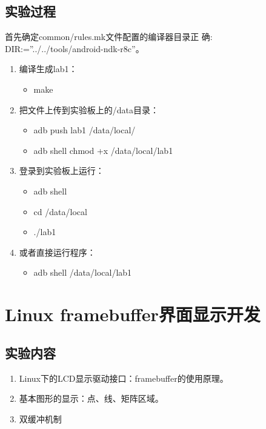 \documentclass{report}
\begin{document}
\section{实验过程}
\par 首先确定common/rules.mk文件配置的编译器目录正
确: DIR:=”../../tools/android-ndk-r8c”。
\begin{enumerate}
    \item 编译生成lab1：
        \begin{itemize}
            \item make
        \end{itemize}
    \item 把文件上传到实验板上的/data目录：
        \begin{itemize}
            \item adb push lab1 /data/local/
            \item adb shell chmod +x /data/local/lab1
        \end{itemize}
    \item 登录到实验板上运行：
        \begin{itemize}
            \item adb shell
            \item cd /data/local
            \item ./lab1
        \end{itemize}
    \item 或者直接运行程序：
        \begin{itemize}
            \item adb shell /data/local/lab1
        \end{itemize}
\end{enumerate}

\chapter{Linux framebuffer界面显示开发}
\section{实验内容}
\begin{enumerate}
    \item Linux下的LCD显示驱动接口：framebuffer的使用原理。
    \item 基本图形的显示：点、线、矩阵区域。
    \item 双缓冲机制
\end{enumerate}
\end{document}
